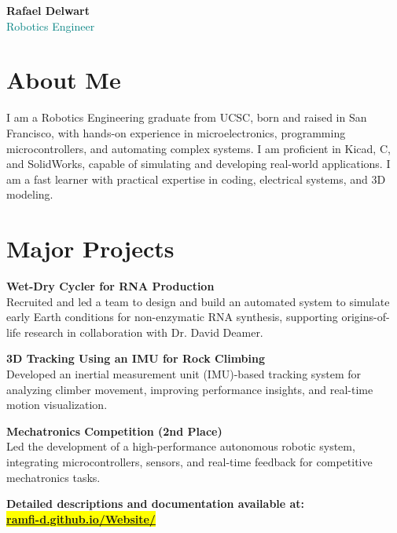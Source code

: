 \documentclass[a4paper,9pt]{article}
\begin{document}
\begin{center}
    {\Large \textbf{Rafael Delwart}} \\
    {\small \textcolor{teal}{Robotics Engineer}} \\
    \vspace{0.3em}
\end{center}

\section*{About Me}
 I am a Robotics Engineering graduate from UCSC, born and raised in San Francisco, with hands-on experience in microelectronics, programming microcontrollers, and automating complex systems. I am proficient in Kicad, C, and SolidWorks, capable of simulating and developing real-world applications. I am a fast learner with practical expertise in coding, electrical systems, and 3D modeling.\normalsize

\section*{Major Projects}

\small 

\textbf{Wet-Dry Cycler for RNA Production} \\
Recruited and led a team to design and build an automated system to simulate early Earth conditions for non-enzymatic RNA synthesis, supporting origins-of-life research in collaboration with Dr. David Deamer.

\textbf{3D Tracking Using an IMU for Rock Climbing} \\
Developed an inertial measurement unit (IMU)-based tracking system for analyzing climber movement, improving performance insights, and real-time motion visualization.

\textbf{Mechatronics Competition (2nd Place)} \\
Led the development of a high-performance autonomous robotic system, integrating microcontrollers, sensors, and real-time feedback for competitive mechatronics tasks.

\textbf{Detailed descriptions and documentation available at:} \\
\colorbox{yellow}{\href{https://ramfi-d.github.io/Website/}{\textbf{ramfi-d.github.io/Website/}}}
\end{document}
